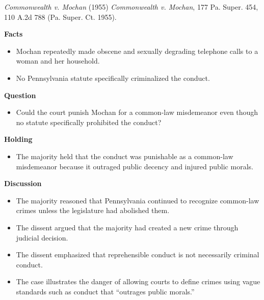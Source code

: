 \documentclass[11pt]{tex/lawoutline}
\begin{document}
\casebox
{\textit{Commonwealth v. Mochan} (1955)}
{\textit{Commonwealth v. Mochan}, 177 Pa. Super. 454, 110 A.2d 788 (Pa. Super. Ct. 1955).}
{
\textbf{Facts}
\begin{itemize}
    \item Mochan repeatedly made obscene and sexually degrading telephone calls to a woman and her household.
    \item No Pennsylvania statute specifically criminalized the conduct.
\end{itemize}

\textbf{Question}
\begin{itemize}
    \item Could the court punish Mochan for a common-law misdemeanor even though no statute specifically prohibited the conduct?
\end{itemize}

\textbf{Holding}
\begin{itemize}
    \item The majority held that the conduct was punishable as a common-law misdemeanor because it outraged public decency and injured public morals.
\end{itemize}

\textbf{Discussion}
\begin{itemize}
    \item The majority reasoned that Pennsylvania continued to recognize common-law crimes unless the legislature had abolished them.
    \item The dissent argued that the majority had created a new crime through judicial decision.
    \item The dissent emphasized that reprehensible conduct is not necessarily criminal conduct.
    \item The case illustrates the danger of allowing courts to define crimes using vague standards such as conduct that ``outrages public morals.''
\end{itemize}
}

\end{document}
